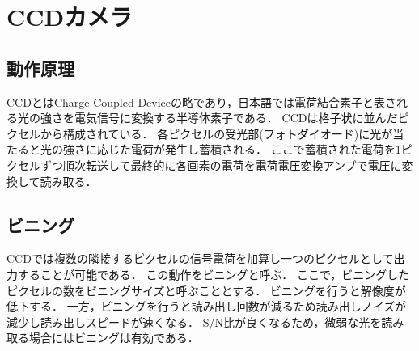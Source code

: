 \section{CCDカメラ}
\subsection{動作原理}
CCDとはCharge Coupled Deviceの略であり，日本語では電荷結合素子と表される光の強さを電気信号に変換する半導体素子である．
CCDは格子状に並んだピクセルから構成されている．
各ピクセルの受光部(フォトダイオード)に光が当たると光の強さに応じた電荷が発生し蓄積される\cite{ccd}．
ここで蓄積された電荷を1ピクセルずつ順次転送して最終的に各画素の電荷を電荷電圧変換アンプで電圧に変換して読み取る\cite{ccd_principle}．



\subsection{ビニング}
CCDでは複数の隣接するピクセルの信号電荷を加算し一つのピクセルとして出力することが可能である．
この動作をビニングと呼ぶ．
ここで，ビニングしたピクセルの数をビニングサイズと呼ぶこととする．
ビニングを行うと解像度が低下する．
一方，ビニングを行うと読み出し回数が減るため読み出しノイズが減少し読み出しスピードが速くなる．
S/N比が良くなるため，微弱な光を読み取る場合にはビニングは有効である．




